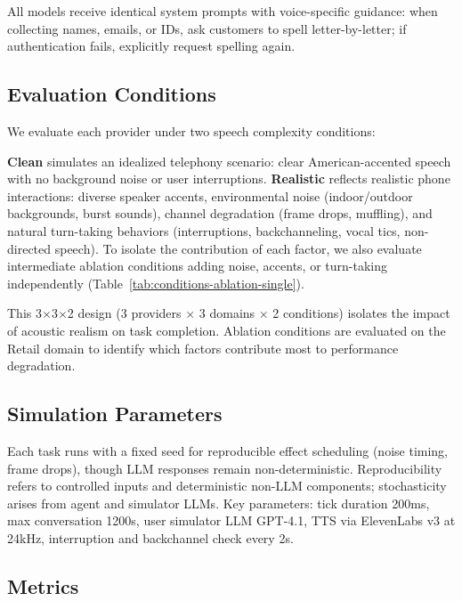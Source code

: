 All models receive identical system prompts with voice-specific guidance: when collecting names, emails, or IDs, ask customers to spell letter-by-letter; if authentication fails, explicitly request spelling again.

\subsection{Evaluation Conditions}

We evaluate each provider under two speech complexity conditions:



\textbf{Clean} simulates an idealized telephony scenario: clear American-accented speech with no background noise or user interruptions. \textbf{Realistic} reflects realistic phone interactions: diverse speaker accents, environmental noise (indoor/outdoor backgrounds, burst sounds), channel degradation (frame drops, muffling), and natural turn-taking behaviors (interruptions, backchanneling, vocal tics, non-directed speech). To isolate the contribution of each factor, we also evaluate intermediate ablation conditions adding noise, accents, or turn-taking independently (Table~\ref{tab:conditions-ablation-single}).



This 3$\times$3$\times$2 design (3 providers $\times$ 3 domains $\times$ 2 conditions) isolates the impact of acoustic realism on task completion. Ablation conditions are evaluated on the Retail domain to identify which factors contribute most to performance degradation.

\subsection{Simulation Parameters}

Each task runs with a fixed seed for reproducible effect scheduling (noise timing, frame drops), though LLM responses remain non-deterministic. Reproducibility refers to controlled inputs and deterministic non-LLM components; stochasticity arises from agent and simulator LLMs. Key parameters: tick duration 200ms, max conversation 1200s, user simulator LLM GPT-4.1, TTS via ElevenLabs v3 at 24kHz, interruption and backchannel check every 2s.

\subsection{Metrics}

